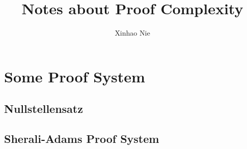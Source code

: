 \documentclass{article}
\begin{document}
\title{Notes about Proof Complexity}
\author{Xinhao Nie}
\maketitle

\section{Some Proof System}
\subsection{Nullstellensatz}


\subsection{Sherali-Adams Proof System}

\end{document}
